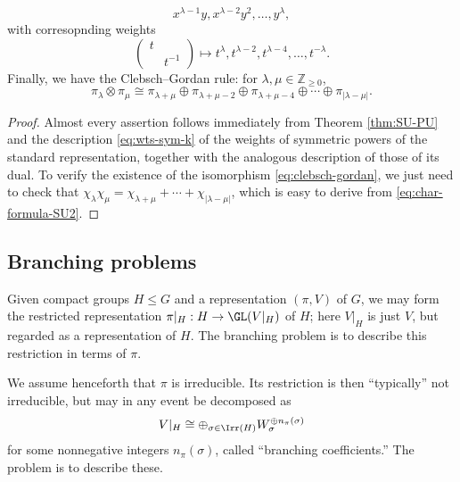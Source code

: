 \documentclass[reqno]{amsart} 
\begin{document}
\begin{theorem}
\begin{equation}
  x^{\lambda-1} y,
  x^{\lambda-2} y^2,
  \dotsc,
  y^{\lambda},
\end{equation}
with corresopnding weights
\begin{equation*}
  \begin{pmatrix}
    t &  \\
      & t^{-1}
  \end{pmatrix}
  \mapsto
  t^{\lambda}, t^{\lambda-2},
  t^{\lambda-4},
  \dotsc,
  t^{-\lambda}.
\end{equation*}
Finally, we have the Clebsch--Gordan rule: for $\lambda, \mu \in \mathbb{Z}_{\geq 0}$,
\begin{equation}\label{eq:clebsch-gordan}
  \pi_{\lambda}
  \otimes \pi_{\mu}
  \cong \pi_{\lambda+\mu}
  \oplus
  \pi_{\lambda+\mu-2}
  \oplus
  \pi_{\lambda+\mu-4}
  \oplus
  \dotsb 
  \oplus
  \pi_{|\lambda-\mu|}.
\end{equation}
\end{theorem}
\begin{proof}
  Almost every assertion follows immediately from Theorem \ref{thm:SU-PU} and the description \eqref{eq:wts-sym-k} of the weights of symmetric powers of the standard representation, together with the analogous description of those of its dual.  To verify the existence of the isomorphism \eqref{eq:clebsch-gordan}, we just need to check that $\chi_\lambda \chi_\mu = \chi_{\lambda+\mu} + \dotsb + \chi_{|\lambda-\mu|}$, which is easy to derive from \eqref{eq:char-formula-SU2}.
\end{proof}

\subsection{Branching problems}
Given compact groups $H \leq G$ and a representation $(\pi,V)$ of $G$, we may form the restricted representation $\pi|_{H} : H \rightarrow \GL(V|_{H})$ of $H$; here $V|_{H}$ is just $V$, but regarded as a representation of $H$.  The branching problem is to describe this restriction in terms of $\pi$.

We assume henceforth that $\pi$ is irreducible.  Its restriction is then ``typically'' not irreducible, but may in any event be decomposed as
\begin{equation*}
  V|_{H}
  \cong \oplus_{\sigma \in \Irr(H)}
  W_\sigma ^{\oplus n_\pi(\sigma)}
\end{equation*}
for some nonnegative integers $n_\pi(\sigma)$, called ``branching coefficients.''  The problem is to describe these.
\end{document}
